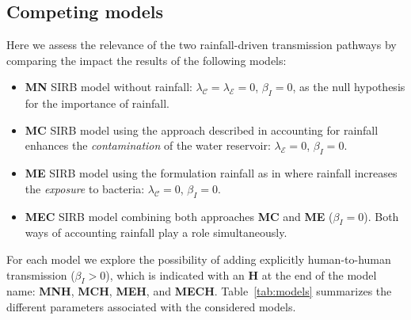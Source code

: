 \subsection{Competing models}
Here we assess the relevance of the two rainfall-driven transmission pathways by comparing the impact the results of the following models:
\begin{itemize}
 \item \textbf{MN} SIRB model without rainfall: $\lambda_{\mathcal{C}} = \lambda_{\mathcal{E}} = 0$, $\beta_{I} = 0$, as the null hypothesis for the importance of rainfall.
  \item \textbf{MC} SIRB model using the approach described in\cite{Rinaldo:Reassessment20102011:2012} accounting for rainfall enhances the \textit{contamination} of the water reservoir: $\lambda_{\mathcal{E}} = 0$, $\beta_{I} = 0$. 
  \item \textbf{ME} SIRB model using the formulation rainfall as in\cite{Eisenberg:ExaminingRainfallCholera:2013} where rainfall increases the \textit{exposure} to bacteria: $\lambda_{\mathcal{C}} = 0$, $\beta_{I} = 0$. 
  \item \textbf{MEC} SIRB model combining both approaches \textbf{MC} and \textbf{ME} ($\beta_{I} = 0$). Both ways of accounting rainfall play a role simultaneously.
\end{itemize}

 For each model we explore the possibility of adding explicitly human-to-human transmission ($\beta_{I} > 0$), which is indicated with an \textbf{H} at the end of the model name: \textbf{MNH}, \textbf{MCH}, \textbf{MEH}, and \textbf{MECH}. Table~\ref{tab:models} summarizes the different parameters associated with the considered models.

